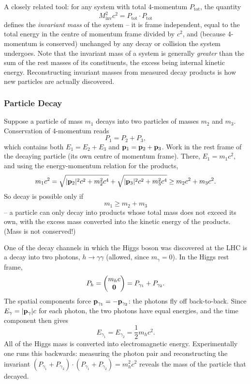 \documentclass[a4paper]{scrartcl}
\begin{document}
\begin{remark}
	A closely related tool: for any system with total 4-momentum $P_{\text{tot}}$, the quantity
	$$
	M_{\text{inv}}^2 c^2 = P_{\text{tot}} \cdot P_{\text{tot}}
	$$
	defines the \emph{invariant mass} of the system -- it is frame independent, equal to the total energy in the centre of momentum frame divided by $c^2$, and (because 4-momentum is conserved) unchanged by any decay or collision the system undergoes. Note that the invariant mass of a system is generally \emph{greater} than the sum of the rest masses of its constituents, the excess being internal kinetic energy. Reconstructing invariant masses from measured decay products is how new particles are actually discovered.
\end{remark}

\subsubsection{Particle Decay}

Suppose a particle of mass $m_1$ decays into two particles of masses $m_2$ and $m_3$. Conservation of 4-momentum reads
$$
P_1 = P_2 + P_3,
$$
which contains both $E_1 = E_2 + E_3$ and $\mathbf{p}_1 = \mathbf{p}_2 + \mathbf{p}_3$. Work in the rest frame of the decaying particle (its own centre of momentum frame). There, $E_1 = m_1 c^2$, and using the energy-momentum relation for the products,
$$
m_1 c^2 = \sqrt{|\mathbf{p}_2|^2 c^2 + m_2^2 c^4} + \sqrt{|\mathbf{p}_3|^2 c^2 + m_3^2 c^4} \geq m_2 c^2 + m_3 c^2.
$$
So decay is possible only if
$$
m_1 \geq m_2 + m_3
$$
-- a particle can only decay into products whose total mass does not exceed its own, with the excess mass converted into the kinetic energy of the products. (Mass is not conserved!)

\begin{example}
	One of the decay channels in which the Higgs boson was discovered at the LHC is a decay into two photons, $h \to \gamma\gamma$ (allowed, since $m_\gamma = 0$). In the Higgs rest frame,
	$$
	P_h = \begin{pmatrix} m_h c \\ \mathbf{0} \end{pmatrix} = P_{\gamma_1} + P_{\gamma_2}.
	$$
	The spatial components force $\mathbf{p}_{\gamma_1} = -\mathbf{p}_{\gamma_2}$: the photons fly off back-to-back. Since $E_\gamma = |\mathbf{p}_\gamma| c$ for each photon, the two photons have equal energies, and the time component then gives
	$$
	E_{\gamma_1} = E_{\gamma_2} = \frac{1}{2}m_h c^2.
	$$
	All of the Higgs mass is converted into electromagnetic energy. Experimentally one runs this backwards: measuring the photon pair and reconstructing the invariant $(P_{\gamma_1} + P_{\gamma_2})\cdot(P_{\gamma_1} + P_{\gamma_2}) = m_h^2c^2$ reveals the mass of the particle that decayed.
\end{example}
\end{document}
